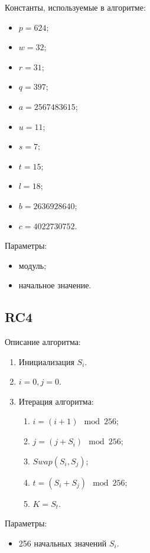 \documentclass[bachelor, och, labwork]{SCWorks}
\begin{document}
Константы, используемые в алгоритме:
\begin{itemize}
  \item $p = 624$;
  \item $w = 32$;
  \item $r = 31$;
  \item $q = 397$;
  \item $a = 2567483615$;
  \item $u = 11$;
  \item $s = 7$;
  \item $t = 15$;
  \item $l = 18$;
  \item $b = 2636928640$;
  \item $c = 4022730752$.
\end{itemize}

Параметры:
\begin{itemize}
  \item модуль;
  \item начальное значение.
\end{itemize}

\subsection{RC4}
Описание алгоритма:
\begin{enumerate}
  \item Инициализация $S_i$.
  \item $i = 0, j = 0$.
  \item Итерация алгоритма:
    \begin{enumerate}
      \item $i = (i + 1) \mod 256$;
      \item $j = (j + S_i) \mod 256$;
      \item $Swap(S_i, S_j)$;
      \item $t = (S_i + S_j) \mod 256$;
      \item $K = S_t$.
    \end{enumerate}
\end{enumerate}

Параметры:
\begin{itemize}
  \item 256 начальных значений $S_i$.
\end{itemize}
\end{document}
